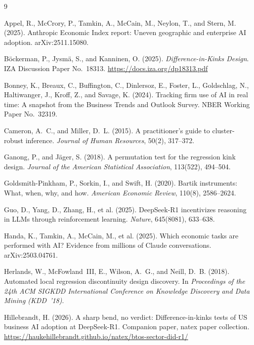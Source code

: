 \documentclass[11pt]{article}
\begin{document}
\footnotesize
\begin{thebibliography}{9}
\setlength{\itemsep}{1pt}\setlength{\parskip}{0pt}

Appel, R., McCrory, P., Tamkin, A., McCain, M., Neylon, T., and Stern, M.
(2025).
Anthropic Economic Index report: Uneven geographic and enterprise AI
adoption.
arXiv:2511.15080.

B\"ockerman, P., Jysm\"a, S., and Kanninen, O. (2025).
\emph{Difference-in-Kinks Design}.
IZA Discussion Paper No.~18313.
\url{https://docs.iza.org/dp18313.pdf}

Bonney, K., Breaux, C., Buffington, C., Dinlersoz, E., Foster, L.,
Goldschlag, N., Haltiwanger, J., Kroff, Z., and Savage, K. (2024).
Tracking firm use of AI in real time: A snapshot from the Business Trends
and Outlook Survey.
NBER Working Paper No.~32319.

Cameron, A.~C., and Miller, D.~L. (2015).
A practitioner's guide to cluster-robust inference.
\emph{Journal of Human Resources}, 50(2), 317--372.

Ganong, P., and J\"ager, S. (2018).
A permutation test for the regression kink design.
\emph{Journal of the American Statistical Association}, 113(522), 494--504.

Goldsmith-Pinkham, P., Sorkin, I., and Swift, H. (2020).
Bartik instruments: What, when, why, and how.
\emph{American Economic Review}, 110(8), 2586--2624.

Guo, D., Yang, D., Zhang, H., et al. (2025).
DeepSeek-R1 incentivizes reasoning in LLMs through reinforcement learning.
\emph{Nature}, 645(8081), 633--638.

Handa, K., Tamkin, A., McCain, M., et al. (2025).
Which economic tasks are performed with AI? Evidence from millions of Claude
conversations.
arXiv:2503.04761.

Herlands, W., McFowland~III, E., Wilson, A.~G., and Neill, D.~B. (2018).
Automated local regression discontinuity design discovery.
In \emph{Proceedings of the 24th ACM SIGKDD International Conference on
Knowledge Discovery and Data Mining (KDD~'18)}.

Hillebrandt, H. (2026).
A sharp bend, no verdict: Difference-in-kinks tests of US business AI
adoption at DeepSeek-R1.
Companion paper, natex paper collection.
\url{https://haukehillebrandt.github.io/natex/btos-sector-did-r1/}


\end{thebibliography}
\end{document}
